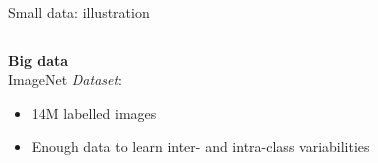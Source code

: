 \documentclass{beamer}
\begin{document}
\begin{frame}{Small data: illustration}
\begin{columns}
\begin{column}{0.48\textwidth}
	\footnotesize
	\center
		{\small	
		\textbf{Big data} \\
		ImageNet\footnotemark
		}
	\vfill
	\flushleft
		\textit{Dataset}: 
		\begin{itemize}
			\item 14M labelled images
			\item Enough data to learn inter- and intra-class variabilities
		\end{itemize}
		
		\begin{figure}[!h]

\end{figure}
\end{column}
\end{columns}
\end{frame}
\end{document}

